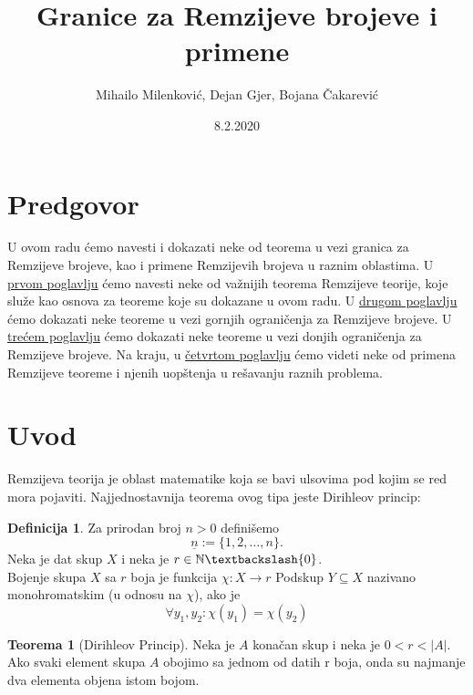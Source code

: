 \documentclass{article}
\title{Granice za Remzijeve brojeve i primene}
\date{8.2.2020}
\author{Mihailo Milenković, Dejan Gjer, Bojana Čakarević}
\theoremstyle{definition}
\newtheorem{definicija}{Definicija}[section]
\newtheorem{teorema}{Teorema}[section]
\begin{document}
	
	\maketitle
	
	\newpage
	
	\tableofcontents
	
	\newpage
	
	\section*{Predgovor}
	
	U ovom radu ćemo navesti i dokazati neke od teorema u vezi granica za Remzijeve brojeve, kao i primene Remzijevih brojeva u raznim oblastima. U \hyperref[uvod]{prvom poglavlju} ćemo navesti neke od važnijih teorema Remzijeve teorije, koje služe kao osnova za teoreme koje su dokazane u ovom radu. U \hyperref[gornjeGranicePoglavlje]{drugom poglavlju} ćemo dokazati neke  teoreme u vezi gornjih ograničenja za Remzijeve brojeve. U \hyperref[donjeGranicePoglavlje]{trećem poglavlju} ćemo dokazati neke teoreme u vezi donjih ograničenja za Remzijeve brojeve. Na kraju, u \hyperref[primenePoglavlje]{četvrtom poglavlju} ćemo videti neke od primena Remzijeve teoreme i njenih uopštenja u rešavanju raznih problema.
	
	\section{Uvod} \label{uvod}
	
	Remzijeva teorija je oblast matematike koja se bavi ulsovima pod kojim se red mora pojaviti. Najjednostavnija teorema ovog tipa jeste Dirihleov princip:
	
	\begin{definicija}
		Za prirodan broj $n>0$ definišemo 
		\[
		\underline{n}:=\{1,2,\ldots,n\}.
		\]
		Neka je dat skup $X$ i neka je $r\in \mathbb{N}\textbackslash \{0\}$.\\	
		Bojenje skupa $X$ sa $r$ boja je funkcija $\chi:X\rightarrow r$
		Podskup $Y\subseteq X$ nazivano monohromatskim (u odnosu na $\chi$), ako je
		\[
		\forall y_1,y_2:\chi(y_1)=\chi(y_2)
		\]
	\end{definicija}
	\begin{teorema}[Dirihleov Princip]
		Neka je $A$ konačan skup i neka je $0<r<|A|$.\\ Ako svaki element skupa $A$ obojimo sa jednom od datih r boja, onda su najmanje dva elementa objena istom bojom.
	\end{teorema}
	
\end{document}
